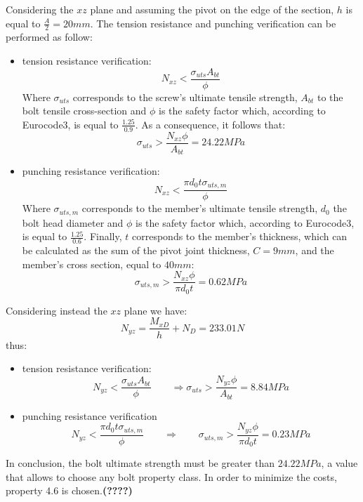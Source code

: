 Considering the $xz$ plane and assuming the pivot on the edge of the section, $h$ is equal to $\frac{A}{2} = 20 mm$. The tension resistance and punching verification can be performed as follow:
\begin{itemize}
    \item tension resistance verification:
    \begin{equation*}
        N_{xz} < \frac{\sigma_{uts}A_{bt}}{\phi}
    \end{equation*}
    Where $\sigma_{uts}$ corresponds to the screw's ultimate tensile strength, $A_{bt}$ to the bolt tensile cross-section and $\phi$ is the safety factor which, according to Eurocode3, is equal to $\frac{1.25}{0.9}$. As a consequence, it follows that:
    \begin{equation*}
       \sigma_{uts} > \frac{N_{xz}\phi}{A_{bt}} = 24.22 MPa
    \end{equation*}
    \item punching resistance verification:
    \begin{equation*}
        N_{xz} < \frac{\pi d_{0} t \sigma_{uts,m}}{\phi}
    \end{equation*}
    Where $\sigma_{uts,m}$ corresponds to the member's ultimate tensile strength, $d_{0}$ the bolt head diameter and $\phi$ is the safety factor which, according to Eurocode3, is equal to $\frac{1.25}{0.6}$. Finally, $t$ corresponds to the member's thickness, which can be calculated as the sum of the pivot joint thickness, $C = 9 mm$, and the member's cross section, equal to $40 mm$:
     \begin{equation*}
       \sigma_{uts,m} > \frac{N_{xz}\phi}{\pi d_{0}t} = 0.62 MPa
    \end{equation*}
\end{itemize}
Considering instead the $xz$ plane we have:\\
\begin{equation*}
    N_{yz} = \frac{M_{xD}}{h} + N_{D} = 233.01 N
\end{equation*}
thus:
\begin{itemize}
    \item tension resistance verification:
    \begin{equation*}
        N_{yz} < \frac{\sigma_{uts}A_{bt}}{\phi} \qquad \Rightarrow \sigma_{uts} > \frac{N_{yz}\phi}{A_{bt}} = 8.84 MPa
    \end{equation*}
    \item punching resistance verification\\
    \begin{equation*}
        N_{yz} < \frac{\pi d_{0} t \sigma_{uts,m}}{\phi} \qquad \Rightarrow \qquad   \sigma_{uts,m} > \frac{N_{yz}\phi}{\pi d_{0}t} = 0.23 MPa
    \end{equation*}
\end{itemize}
In conclusion, the bolt ultimate strength must be greater than $24.22 MPa$, a value that allows to choose any bolt property class. In order to minimize the costs, property 4.6 is chosen.\textbf{(????)} 

